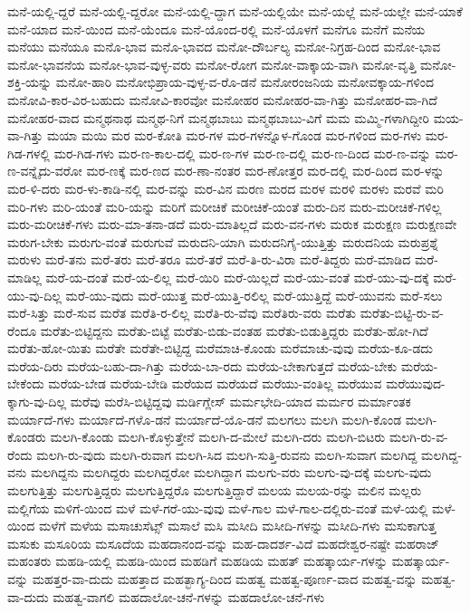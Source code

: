 {ಮನೆ-ಯಲ್ಲಿ-ದ್ದರೆ
ಮನೆ-ಯಲ್ಲಿ-ದ್ದರೋ
ಮನೆ-ಯಲ್ಲಿ-ದ್ದಾಗ
ಮನೆ-ಯಲ್ಲಿಯೇ
ಮನೆ-ಯಲ್ಲೆ
ಮನೆ-ಯಲ್ಲೇ
ಮನೆ-ಯಾಕೆ
ಮನೆ-ಯಾದ
ಮನೆ-ಯಿಂದ
ಮನೆ-ಯೆಂದೂ
ಮನೆ-ಯೊಂದ-ರಲ್ಲಿ
ಮನೆ-ಯೊಳಗೆ
ಮನೆಗೂ
ಮನೆಗೆ
ಮನೆಯ
ಮನೆಯು
ಮನೆಯೂ
ಮನೊ-ಭಾವ
ಮನೊ-ಭಾವದ
ಮನೋ-ದೌರ್ಬಲ್ಯ
ಮನೋ-ನಿಗ್ರಹ-ದಿಂದ
ಮನೋ-ಭಾವ
ಮನೋ-ಭಾವನೆಯ
ಮನೋ-ಭಾವ-ವುಳ್ಳ-ವರು
ಮನೋ-ರೋಗ
ಮನೋ-ವಾಕ್ಕಾಯ-ವಾಗಿ
ಮನೋ-ವೃತ್ತಿ
ಮನೋ-ಶಕ್ತಿ-ಯನ್ನು
ಮನೋ-ಹಾರಿ
ಮನೋಭಿಪ್ರಾಯ-ವುಳ್ಳ-ವ-ರೊ-ಡನೆ
ಮನೋರಂಜನಿಯ
ಮನೋವಕ್ಕಾಯ-ಗಳಿಂದ
ಮನೋವಿ-ಕಾರ-ವಿರ-ಬಹುದು
ಮನೋವಿ-ಕಾರವೋ
ಮನೋಹರ
ಮನೋಹರ-ವಾ-ಗಿತ್ತು
ಮನೋಹರ-ವಾ-ಗಿದೆ
ಮನೋಹರ-ವಾದ
ಮನ್ಮಥನಾಥ
ಮನ್ಮಥ-ನಿಗೆ
ಮನ್ಮಥಬಾಬು
ಮನ್ಮಥಬಾಬು-ವಿಗೆ
ಮಮ
ಮಮ್ಮಿ-ಗಳಾಗಿದ್ದೀರಿ
ಮಯ-ವಾ-ಗಿತ್ತು
ಮಯಾ
ಮಯಿ
ಮರ
ಮರ-ಕೋತಿ
ಮರ-ಗಳ
ಮರ-ಗಳನ್ನೊಳ-ಗೊಂಡ
ಮರ-ಗಳಿಂದ
ಮರ-ಗಳು
ಮರ-ಗಿಡ-ಗಳಲ್ಲಿ
ಮರ-ಗಿಡ-ಗಳು
ಮರ-ಣ-ಕಾಲ-ದಲ್ಲಿ
ಮರ-ಣ-ಗಳ
ಮರ-ಣ-ದಲ್ಲಿ
ಮರ-ಣ-ದಿಂದ
ಮರ-ಣ-ವನ್ನು
ಮರ-ಣ-ವನ್ನೈದು-ವರೋ
ಮರ-ಣಕ್ಕೆ
ಮರ-ಣದ
ಮರ-ಣಾ-ನಂತರ
ಮರ-ಣೋತ್ತರ
ಮರ-ದಲ್ಲಿ
ಮರ-ದಿಂದ
ಮರ-ಳನ್ನು
ಮರ-ಳಿ-ದರು
ಮರ-ಳು-ಕಾಡಿ-ನಲ್ಲಿ
ಮರ-ವನ್ನು
ಮರ-ವಿನ
ಮರಣ
ಮರದ
ಮರಳ
ಮರಳಿ
ಮರಳು
ಮರವೆ
ಮರಿ
ಮರಿ-ಗಳು
ಮರಿ-ಯಂತೆ
ಮರಿ-ಯನ್ನು
ಮರಿಗೆ
ಮರೀಚಿಕೆ
ಮರೀಚಿಕೆ-ಯಂತೆ
ಮರು-ದಿನ
ಮರು-ಮರೀಚಿಕೆ-ಗಳಿಲ್ಲ
ಮರು-ಮರೀಚಿಕೆ-ಗಳು
ಮರು-ಮಾ-ತನಾ-ಡದೆ
ಮರು-ಮಾತಿಲ್ಲದೆ
ಮರು-ವನ-ಗಳು
ಮರುಕ
ಮರುಕ್ಷಣ
ಮರುಕ್ಷಣವೇ
ಮರುಗ-ಬೇಕು
ಮರುಗು-ವಂತೆ
ಮರುಗುವೆ
ಮರುದನಿ-ಯಾಗಿ
ಮರುದನಿಗೈ-ಯುತ್ತಿತ್ತು
ಮರುದನಿಯ
ಮರುಪ್ರಶ್ನೆ
ಮರುಳು
ಮರೆ-ತನು
ಮರೆ-ತರು
ಮರೆ-ತರೂ
ಮರೆ-ತರೆ
ಮರೆ-ತಿ-ರು-ವಿರಾ
ಮರೆ-ತಿದ್ದರು
ಮರೆ-ಮಾಡಿದ
ಮರೆ-ಮಾಡಿಲ್ಲ
ಮರೆ-ಯ-ದಂತೆ
ಮರೆ-ಯ-ಲಿಲ್ಲ
ಮರೆ-ಯಿರಿ
ಮರೆ-ಯಿಲ್ಲದೆ
ಮರೆ-ಯು-ವಂತೆ
ಮರೆ-ಯು-ವು-ದಕ್ಕೆ
ಮರೆ-ಯು-ವು-ದಿಲ್ಲ
ಮರೆ-ಯು-ವುದು
ಮರೆ-ಯುತ್ತ
ಮರೆ-ಯುತ್ತಿ-ರಲಿಲ್ಲ
ಮರೆ-ಯುತ್ತಿದ್ದೆ
ಮರೆ-ಯುವನು
ಮರೆ-ಸಲು
ಮರೆ-ಸಿತ್ತು
ಮರೆ-ಸುವ
ಮರೆತ
ಮರೆತಿ-ರ-ಲಿಲ್ಲ
ಮರೆತಿ-ರು-ವೆವು
ಮರೆತಿರು-ವರು
ಮರೆತು
ಮರೆತು-ಬಿಟ್ಟಿ-ರು-ವ-ರೆಂದೂ
ಮರೆತು-ಬಿಟ್ಟಿದ್ದನು
ಮರೆತು-ಬಿಟ್ಟೆ
ಮರೆತು-ಬಿಡು-ವಂತಹ
ಮರೆತು-ಬಿಡುತ್ತಿದ್ದರು
ಮರೆತು-ಹೋ-ಗಿದೆ
ಮರೆತು-ಹೋ-ಯಿತು
ಮರೆತೇ
ಮರೆತೇ-ಬಿಟ್ಟಿದ್ದ
ಮರೆಮಾಚಿ-ಕೊಂಡು
ಮರೆಮಾಚು-ವುವು
ಮರೆಯ-ಕೂ-ಡದು
ಮರೆಯ-ದಿರು
ಮರೆಯ-ಬಹು-ದಾ-ಗಿತ್ತು
ಮರೆಯ-ಬಾ-ರದು
ಮರೆಯ-ಬೇಕಾಗುತ್ತದೆ
ಮರೆಯ-ಬೇಕು
ಮರೆಯ-ಬೇಕೆಂದು
ಮರೆಯ-ಬೇಡ
ಮರೆಯ-ಬೇಡಿ
ಮರೆಯದ
ಮರೆಯದೆ
ಮರೆಯು-ವಂತಿಲ್ಲ
ಮರೆಯುವ
ಮರೆಯುವುದ-ಕ್ಕಾಗು-ವು-ದಿಲ್ಲ
ಮರೆವು
ಮರೆಸಿ-ಬಿಟ್ಟಿದ್ದವು
ಮರ್ಡಿಗ್ಲೇಸ್
ಮರ್ಮಭೇದಿ-ಯಾದ
ಮರ್ಮರ
ಮರ್ಮಾಂತಕ
ಮರ್ಯಾದೆ-ಗಳು
ಮರ್ಯಾದೆ-ಗಳೊ-ಡನೆ
ಮರ್ಯಾದೆ-ಯೊ-ಡನೆ
ಮಲಗಲು
ಮಲಗಿ
ಮಲಗಿ-ಕೊಂಡ
ಮಲಗಿ-ಕೊಂಡರು
ಮಲಗಿ-ಕೊಂಡು
ಮಲಗಿ-ಕೊಳ್ಳುತ್ತೇನೆ
ಮಲಗಿ-ದ-ಮೇಲೆ
ಮಲಗಿ-ದರು
ಮಲಗಿ-ಬಿಟರು
ಮಲಗಿ-ರು-ವ-ರೆಂದು
ಮಲಗಿ-ರು-ವುದು
ಮಲಗಿ-ರುವಾಗ
ಮಲಗಿ-ಸಿದ
ಮಲಗಿ-ಸುತ್ತಿ-ರುವನು
ಮಲಗಿ-ಸುವಾಗ
ಮಲಗಿದ್ದ
ಮಲಗಿದ್ದ-ವನು
ಮಲಗಿದ್ದನು
ಮಲಗಿದ್ದರು
ಮಲಗಿದ್ದರೋ
ಮಲಗಿದ್ದಾಗ
ಮಲಗು-ವರು
ಮಲಗು-ವು-ದಕ್ಕೆ
ಮಲಗು-ವುದು
ಮಲಗುತ್ತಿತ್ತು
ಮಲಗುತ್ತಿದ್ದರು
ಮಲಗುತ್ತಿದ್ದರೊ
ಮಲಗುತ್ತಿದ್ದಾರೆ
ಮಲಯ
ಮಲಯ-ರನ್ನು
ಮಲಿನ
ಮಲ್ಲರು
ಮಲ್ಲಿಗೆಯ
ಮಳಿಗೆ-ಯಿಂದ
ಮಳೆ
ಮಳೆ-ಗರೆ-ಯು-ವುವು
ಮಳೆ-ಗಾಲ
ಮಳೆ-ಗಾಲ-ದಲ್ಲಿರು-ವಂತೆ
ಮಳೆ-ಯಲ್ಲಿ
ಮಳೆ-ಯಿಂದ
ಮಳೆಗೆ
ಮಳೆಯ
ಮಸಾಚುಸೆಟ್ಸ್
ಮಸಾಲೆ
ಮಸಿ
ಮಸೀದಿ
ಮಸೀದಿ-ಗಳನ್ನು
ಮಸೀದಿ-ಗಳು
ಮಸುಕಾಗುತ್ತ
ಮಸುಕು
ಮಸೂರಿಯ
ಮಸೂದೆಯ
ಮಹದಾನಂದ-ವನ್ನು
ಮಹ-ದಾದರ್ಶ-ವಿದೆ
ಮಹದೇಶ್ವರ-ನಷ್ಟೇ
ಮಹರಾಜ್
ಮಹಂತರು
ಮಹಡಿ-ಯಲ್ಲಿ
ಮಹಡಿ-ಯಿಂದ
ಮಹಡಿಗೆ
ಮಹಡಿಯ
ಮಹತ್
ಮಹತ್ಕಾರ್ಯ-ಗಳನ್ನು
ಮಹತ್ಕಾರ್ಯ-ವನ್ನು
ಮಹತ್ತರ-ವಾ-ದುದು
ಮಹತ್ತಾದ
ಮಹತ್ಭಾಗ್ಯ-ದಿಂದ
ಮಹತ್ವ
ಮಹತ್ವ-ಪೂರ್ಣ-ವಾದ
ಮಹತ್ವ-ವನ್ನು
ಮಹತ್ವ-ವಾ-ದುದು
ಮಹತ್ವ-ವಾಗಲಿ
ಮಹದಾಲೋ-ಚನೆ-ಗಳನ್ನು
ಮಹದಾಲೋ-ಚನೆ-ಗಳು
}
